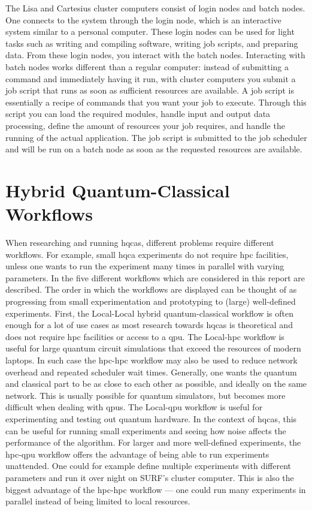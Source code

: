 The Lisa and Cartesius cluster computers consist of login nodes and batch nodes.
One connects to the system through the login node, which is an interactive system similar to a personal computer.
These login nodes can be used for light tasks such as writing and compiling software, writing job scripts, and preparing data.
From these login nodes, you interact with the batch nodes.
Interacting with batch nodes works different than a regular computer: instead of submitting a command and immediately having it run, with cluster computers you submit a job script that runs as soon as sufficient resources are available.
A job script is essentially a recipe of commands that you want your job to execute.
Through this script you can load the required modules, handle input and output data processing, define the amount of resources your job requires, and handle the running of the actual application.
The job script is submitted to the job scheduler and will be run on a batch node as soon as the requested resources are available.

\section{Hybrid Quantum-Classical Workflows} \label{sec:workflows}
When researching and running \glspl{hqca}, different problems require different workflows.
For example, small \gls{hqca} experiments do not require \gls{hpc} facilities, unless one wants to run the experiment many times in parallel with varying parameters.
In  the five different workflows which are considered in this report are described.
The order in which the workflows are displayed can be thought of as progressing from small experimentation and prototyping to (large) well-defined experiments.
First, the Local-Local hybrid quantum-classical workflow is often enough for a lot of use cases as most research towards \glspl{hqca} is theoretical and does not require \gls{hpc} facilities or access to a \gls{qpu}.
The Local-\gls{hpc} workflow is useful for large quantum circuit simulations that exceed the resources of modern laptops.
In such case the \gls{hpc}-\gls{hpc} workflow may also be used to reduce network overhead and repeated scheduler wait times.
Generally, one wants the quantum and classical part to be as close to each other as possible, and ideally on the same network.
This is usually possible for quantum simulators, but becomes more difficult when dealing with \glspl{qpu}.
The Local-\gls{qpu} workflow is useful for experimenting and testing out quantum hardware.
In the context of \glspl{hqca}, this can be useful for running small experiments and seeing how noise affects the performance of the algorithm.
For larger and more well-defined experiments, the \gls{hpc}-\gls{qpu} workflow offers the advantage of being able to run experiments unattended.
One could for example define multiple experiments with different parameters and run it over night on SURF's cluster computer.
This is also the biggest advantage of the \gls{hpc}-\gls{hpc} workflow --- one could run many experiments in parallel instead of being limited to local resources.

